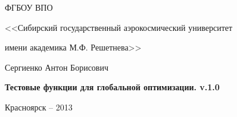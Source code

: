 \thispagestyle{empty}

\begin{center}
ФГБОУ ВПО \par
<<Сибирский государственный аэрокосмический университет \par имени академика М.Ф. Решетнева>>\par 
\par
\end{center}

\vspace{20mm}


\vspace{30mm}
\begin{center}
{\large Сергиенко Антон Борисович}
\end{center}

\vspace{5mm}
\begin{center}
{\bf \large Тестовые функции для глобальной оптимизации. v.1.0
\par}

\vspace{10mm}


\vspace{10mm}

\end{center}

\vspace{80mm}


\vspace{20mm}
\begin{center}
{Красноярск -- 2013}
\end{center}

\newpage
